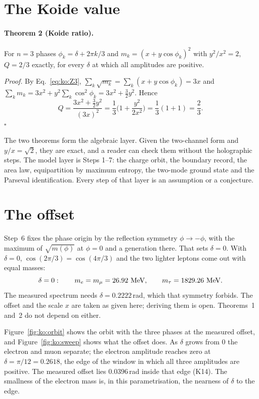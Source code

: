 \section{The Koide value}\label{sec:ko:value}
\paragraph{Theorem 2 (Koide ratio).} For $n=3$ phases $\phi_k=\delta+2\pi k/3$ and $m_k=(x+y\cos\phi_k)^2$ with $y^2/x^2=2$, $Q=2/3$ exactly, for
every $\delta$ at which all amplitudes are positive.

\emph{Proof.} By Eq.~\eqref{eq:ko:Z3}, $\sum_k\sqrt{m_k}=\sum_k(x+y\cos\phi_k)=3x$ and
$\sum_km_k=3x^2+y^2\sum_k\cos^2\phi_k=3x^2+\tfrac32y^2$. Hence
\begin{equation}
Q=\frac{3x^2+\tfrac32y^2}{(3x)^2}=\frac13\Big(1+\frac{y^2}{2x^2}\Big)=\frac13(1+1)=\frac23.\label{eq:ko:thm2}
\end{equation}
$\square$ \derived

The two theorems form the algebraic layer. Given the two-channel form and $y/x=\sqrt2$, they are exact, and a reader can check them without the
holographic steps. The model layer is Steps 1--7: the charge orbit, the boundary record, the area law, equipartition by maximum entropy, the
two-mode ground state and the Parseval identification. Every step of that layer is an assumption or a conjecture.

\section{The offset}\label{sec:ko:offset}
Step~6 fixes the phase origin by the reflection symmetry $\phi\to-\phi$, with the maximum of $\sqrt{m(\phi)}$ at $\phi=0$ and a generation there.
That sets $\delta=0$. With $\delta=0$, $\cos(2\pi/3)=\cos(4\pi/3)$ and the two lighter leptons come out with equal masses:
\begin{equation}
\delta=0:\qquad m_e=m_\mu=26.92\ {\rm MeV},\qquad m_\tau=1829.26\ {\rm MeV}.\label{eq:ko:delta0}
\end{equation}
\calc{} The measured spectrum needs $\delta=0.2222$\,rad, which that symmetry forbids. The offset and the scale $x$ are taken as given here; deriving them is open. Theorems~1 and~2 do not depend on either. \openprob

Figure~\ref{fig:ko:orbit} shows the orbit with the three phases at the measured offset, and Figure~\ref{fig:ko:sweep} shows what the offset does.
As $\delta$ grows from 0 the electron and muon separate; the electron amplitude reaches zero at $\delta=\pi/12=0.2618$, the edge of the window in
which all three amplitudes are positive. The measured offset lies $0.0396$\,rad inside that edge (K14). \calc{} The smallness of the electron mass is,
in this parametrisation, the nearness of $\delta$ to the edge.

